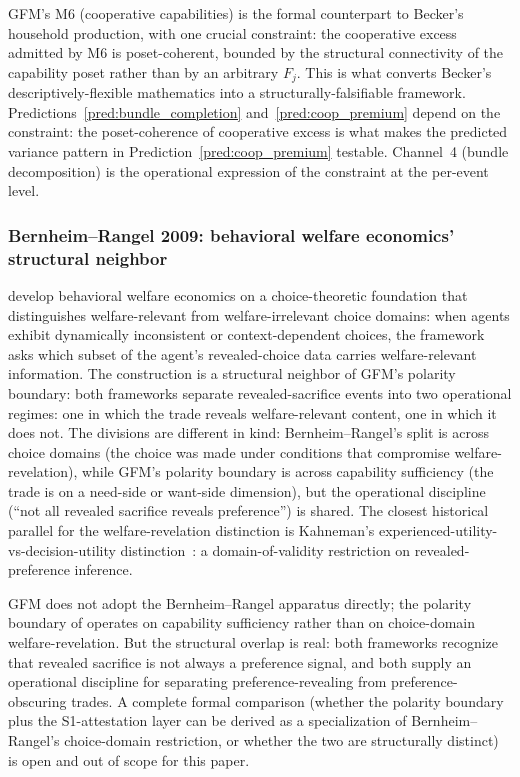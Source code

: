 GFM's M6 (cooperative capabilities) is the formal counterpart to
Becker's household production, with one crucial constraint: the
cooperative excess admitted by M6 is poset-coherent, bounded by
the structural connectivity of the capability poset rather than
by an arbitrary $F_j$.  This is what converts Becker's
descriptively-flexible mathematics into a structurally-falsifiable
framework.  Predictions~\ref{pred:bundle_completion}
and~\ref{pred:coop_premium} depend on the constraint: the
poset-coherence of cooperative excess is what makes the
predicted variance pattern in Prediction~\ref{pred:coop_premium}
testable.  Channel~4 (bundle decomposition) is the operational
expression of the constraint at the per-event level.

\subsubsection{Bernheim--Rangel 2009: behavioral welfare economics' structural neighbor}

\citet{bernheim2009beyond} develop behavioral welfare economics
on a choice-theoretic foundation that distinguishes
welfare-relevant from welfare-irrelevant choice domains: when
agents exhibit dynamically inconsistent or context-dependent
choices, the framework asks which subset of the agent's
revealed-choice data carries welfare-relevant information.  The
construction is a structural neighbor of GFM's polarity
boundary: both frameworks separate revealed-sacrifice events
into two operational regimes: one in which the trade reveals
welfare-relevant content, one in which it does not.  The
divisions are different in kind: Bernheim--Rangel's split is
across choice domains (the choice was made under conditions
that compromise welfare-revelation), while GFM's polarity
boundary is across capability sufficiency (the trade is on a
need-side or want-side dimension), but the operational
discipline (``not all revealed sacrifice reveals
preference'') is shared.  The closest historical parallel for
the welfare-revelation distinction is Kahneman's
experienced-utility-vs-decision-utility
distinction~\citep{kahneman1997back}: a domain-of-validity
restriction on revealed-preference inference.

GFM does not adopt the Bernheim--Rangel apparatus directly; the
polarity boundary of \citep[Need~Sufficiency]{lasser2026paper8b}
operates on capability sufficiency rather than on choice-domain
welfare-revelation.  But the structural overlap is real: both
frameworks recognize that revealed sacrifice is not always a
preference signal, and both supply an operational discipline
for separating preference-revealing from preference-obscuring
trades.  A complete formal comparison (whether the polarity
boundary plus the S1-attestation layer can be derived as a
specialization of Bernheim--Rangel's choice-domain restriction,
or whether the two are structurally distinct) is open and out
of scope for this paper.

